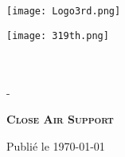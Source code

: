 \thispagestyle{empty}

\begin{center}
    \null
    
    \vfill
    
    \texttt{[image: Logo3rd.png]}
    
    \vfill
    
    \begin{minipage}{\textwidth}
        \centering
        \texttt{[image: 319th.png]}\\[1ex]
        {\Large \rgt{}}\\[1ex]
        {\Large \inmem{}}\\[2ex]
    \end{minipage}
    
    \vfil
    
    {\Large - }%
    
    \vfil
    
    {\fontsize{40}{60}\selectfont \textbf{\textsc{Close Air Support}}}%
    
    \vfil
    
    
    
    
    
    \vskip2cm %
    
    \vfill
    
    {\large \version }%
    
    \vfil
    
    {\large Publié le \today}%
    
    \vfill
\end{center}